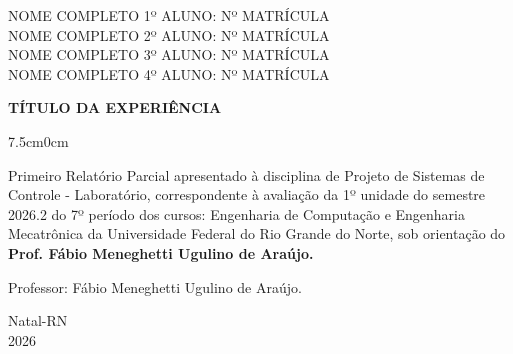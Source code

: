 \documentclass[a4paper,12pt]{article}
\begin{document}
\newpage


\thispagestyle{empty}

\begin{center}
\begin{normalsize}
NOME COMPLETO 1º ALUNO: Nº MATRÍCULA\\
\vspace{0.8cm}
NOME COMPLETO 2º ALUNO: Nº MATRÍCULA\\
\vspace{0.8cm}
NOME COMPLETO 3º ALUNO: Nº MATRÍCULA\\
\vspace{0.8cm}
NOME COMPLETO 4º ALUNO: Nº MATRÍCULA\\

\end{normalsize}
\end{center}
\vspace{3cm}

{\bf{\large {\centering TÍTULO DA EXPERIÊNCIA\\}}}

\vspace{4cm}

\begin{adjustwidth}{7.5cm}{0cm}

{\normalsize

Primeiro Relatório Parcial apresentado à disciplina de
Projeto de Sistemas de Controle - Laboratório, correspondente à
avaliação da 1º unidade do semestre 2026.2 do 7º período
dos cursos: Engenharia de Computação e Engenharia Mecatrônica da
Universidade Federal do Rio Grande do Norte, sob
orientação do {\bf Prof. Fábio Meneghetti Ugulino de
Araújo.}

}

\end{adjustwidth}

\vspace{2cm}

\begin{center}

Professor:  Fábio Meneghetti Ugulino de Araújo.

\vspace{2.5cm}

{\large Natal-RN\\
2026}

\end{center}

\newpage

\end{document}
